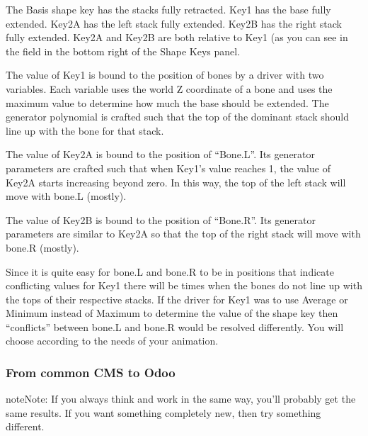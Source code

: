 \documentclass[a4paper,10pt,french]{sphinxmanual}
\begin{document}
The Basis shape key has the stacks fully retracted. Key1 has the base fully extended.
Key2A has the left stack fully extended. Key2B has the right stack fully extended.
Key2A and Key2B are both relative to Key1 (as you can see in the field
in the bottom right of the Shape Keys panel.

The value of Key1 is bound to the position of bones by a driver with
two variables. Each variable uses the world Z coordinate of a bone
and uses the maximum value to determine how much the base should be
extended. The generator polynomial is crafted such that the top of
the dominant stack should line up with the bone for that stack.

The value of Key2A is bound to the position of ``Bone.L''.
Its generator parameters are crafted such that when Key1's value reaches 1,
the value of Key2A starts increasing beyond zero. In this way,
the top of the left stack will move with bone.L (mostly).

The value of Key2B is bound to the position of ``Bone.R''. Its generator
parameters are similar to Key2A so that the top of the right stack
will move with bone.R (mostly).

Since it is quite easy for bone.L and bone.R to be in positions that
indicate conflicting values for Key1 there will be times when the
bones do not line up with the tops of their respective stacks. If the
driver for Key1 was to use Average or Minimum instead of Maximum to
determine the value of the shape key then ``conflicts'' between bone.L
and bone.R would be resolved differently. You will choose according to
the needs of your animation.


\subsubsection{From common CMS to Odoo}
\label{\detokenize{docs/tuts/autocad-tut01:from-common-cms-to-odoo}}
\begin{sphinxadmonition}{note}{Note:}
If you always think and work in the same way, you’ll probably get the same results. If you want something completely new,  then try something different.
\end{sphinxadmonition}
\end{document}
